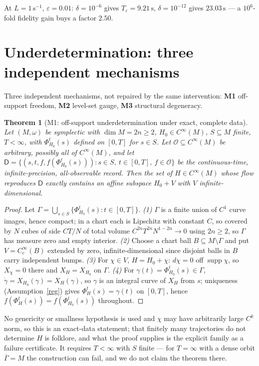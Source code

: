 \documentclass[12pt,a4paper]{article}
\theoremstyle{definition}
\theoremstyle{plain}
\newtheorem{theorem}[definition]{Theorem}
\theoremstyle{commentary}
\newcommand{\Cinf}{C^{\infty}}
\newcommand{\Oc}{\mathcal{O}}
\newcommand{\Dsf}{\mathsf{D}}
\newcommand{\eps}{\varepsilon}
\begin{document}
At $L=1\,\mathrm{s^{-1}}$, $\eps=0.01$: $\delta=10^{-6}$ gives $T_\eps=9.21\,\mathrm{s}$, $\delta=10^{-12}$ gives $23.03\,\mathrm{s}$ --- a $10^{6}$-fold fidelity gain buys a factor $2.50$.

\section{Underdetermination: three independent mechanisms}
\label{s5}

Three independent mechanisms, not repaired by the same intervention: \textbf{M1} off-support freedom, \textbf{M2} level-set gauge, \textbf{M3} structural degeneracy.

\begin{theorem}[M1: off-support underdetermination under exact, complete data]
\label{off}
Let $(M,\omega)$ be symplectic with $\dim M=2n\ge2$, $H_0\in\Cinf(M)$, $S\subseteq M$ finite, $T<\infty$, with $\Phi^t_{H_0}(s)$ defined on $[0,T]$ for $s\in S$. Let $\Oc\subseteq\Cinf(M)$ be arbitrary, possibly all of $\Cinf(M)$, and let $\Dsf=\{(s,t,f,f(\Phi^t_{H_0}(s))):s\in S,\ t\in[0,T],\ f\in\Oc\}$ be the continuous-time, infinite-precision, all-observable record. Then the set of $H\in\Cinf(M)$ whose flow reproduces $\Dsf$ exactly contains an affine subspace $H_0+V$ with $V$ infinite-dimensional.
\end{theorem}

\begin{proof}
Let $\Gamma=\bigcup_{s\in S}\{\Phi^t_{H_0}(s):t\in[0,T]\}$. \emph{(1)} $\Gamma$ is a finite union of $C^1$ curve images, hence compact; in a chart each is Lipschitz with constant $C$, so covered by $N$ cubes of side $CT/N$ of total volume $C^{2n}T^{2n}N^{1-2n}\to0$ using $2n\ge2$, so $\Gamma$ has measure zero and empty interior. \emph{(2)} Choose a chart ball $B\subseteq M\setminus\Gamma$ and put $V=C_c^\infty(B)$ extended by zero, infinite-dimensional since disjoint balls in $B$ carry independent bumps. \emph{(3)} For $\chi\in V$, $H=H_0+\chi$: $d\chi=0$ off $\operatorname{supp}\chi$, so $X_\chi=0$ there and $X_H=X_{H_0}$ on $\Gamma$. \emph{(4)} For $\gamma(t)=\Phi^t_{H_0}(s)\in\Gamma$, $\dot\gamma=X_{H_0}(\gamma)=X_H(\gamma)$, so $\gamma$ is an integral curve of $X_H$ from $s$; uniqueness (Assumption~\ref{reg}) gives $\Phi^t_H(s)=\gamma(t)$ on $[0,T]$, hence $f(\Phi^t_H(s))=f(\Phi^t_{H_0}(s))$ throughout.
\end{proof}

No genericity or smallness hypothesis is used and $\chi$ may have arbitrarily large $C^k$ norm, so this is an exact-data statement; that finitely many trajectories do not determine $H$ is folklore, and what the proof supplies is the explicit family as a failure certificate. It requires $T<\infty$ with $S$ finite --- for $T=\infty$ with a dense orbit $\overline{\Gamma}=M$ the construction can fail, and we do not claim the theorem there.
\end{document}
